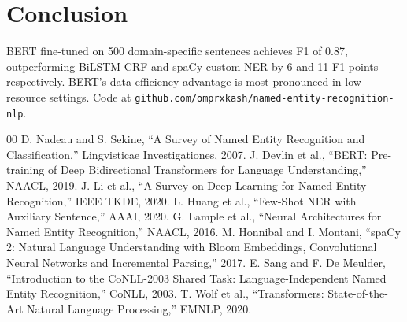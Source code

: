 \documentclass[conference]{IEEEtran}
\begin{document}
\section{Conclusion}

BERT fine-tuned on 500 domain-specific sentences achieves F1 of 0.87, outperforming BiLSTM-CRF and spaCy custom NER by 6 and 11 F1 points respectively. BERT's data efficiency advantage is most pronounced in low-resource settings. Code at \texttt{github.com/omprxkash/named-entity-recognition-nlp}.

\begin{thebibliography}{00}
 D. Nadeau and S. Sekine, ``A Survey of Named Entity Recognition and Classification,'' Lingvisticae Investigationes, 2007.
 J. Devlin et al., ``BERT: Pre-training of Deep Bidirectional Transformers for Language Understanding,'' NAACL, 2019.
 J. Li et al., ``A Survey on Deep Learning for Named Entity Recognition,'' IEEE TKDE, 2020.
 L. Huang et al., ``Few-Shot NER with Auxiliary Sentence,'' AAAI, 2020.
 G. Lample et al., ``Neural Architectures for Named Entity Recognition,'' NAACL, 2016.
 M. Honnibal and I. Montani, ``spaCy 2: Natural Language Understanding with Bloom Embeddings, Convolutional Neural Networks and Incremental Parsing,'' 2017.
 E. Sang and F. De Meulder, ``Introduction to the CoNLL-2003 Shared Task: Language-Independent Named Entity Recognition,'' CoNLL, 2003.
 T. Wolf et al., ``Transformers: State-of-the-Art Natural Language Processing,'' EMNLP, 2020.
\end{thebibliography}
\end{document}
